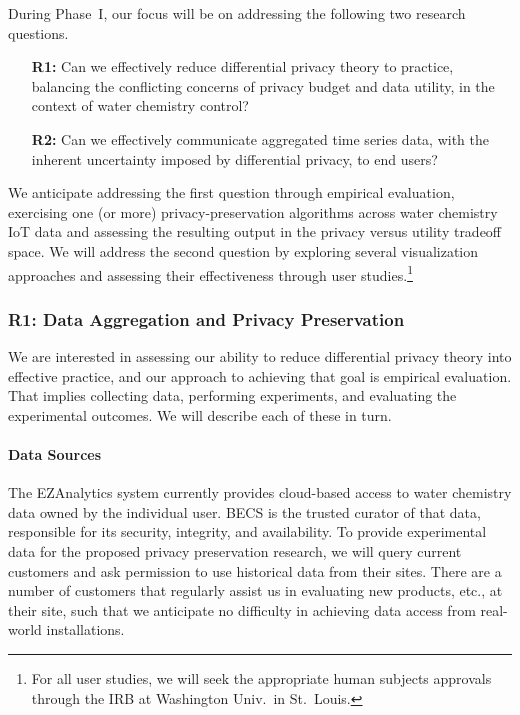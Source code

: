 During Phase~I, our focus will be on addressing the following two
research questions.
\begin{enumerate}
\item[\textbf{R1:}] Can we effectively reduce differential privacy theory to practice,
balancing the conflicting concerns of privacy budget and data utility, in
the context of water chemistry control?
\item[\textbf{R2:}] Can we effectively communicate aggregated time series data,
with the inherent uncertainty imposed by differential privacy, to end users?
\end{enumerate}

We anticipate addressing the first question through empirical evaluation,
exercising one (or more) privacy-preservation algorithms across water
chemistry IoT data and assessing the resulting output in the privacy
versus utility tradeoff space.  We will address the second question by
exploring several visualization approaches and assessing their effectiveness
through user studies.\footnote{For all user studies, we will seek the
appropriate human subjects approvals through the IRB at Washington
Univ.~in St.~Louis.}

\subsubsection{R1: Data Aggregation and Privacy Preservation}

We are interested in assessing our ability to reduce differential
privacy theory into effective practice, and our approach to achieving
that goal is empirical evaluation.  That implies collecting data,
performing experiments, and evaluating the experimental outcomes.
We will describe each of these in turn.

\paragraph{Data Sources}
The EZAnalytics\texttrademark{} system currently provides cloud-based access to
water chemistry data owned by the individual user.
BECS is the trusted curator of that data, responsible for its security,
integrity, and availability.  To provide experimental
data for the proposed privacy preservation research, we will query 
current customers and ask permission to use historical data from their
sites.  There are a number of customers that regularly assist
us in evaluating new products, etc., at their site, such that we anticipate
no difficulty in achieving data access from real-world installations.

